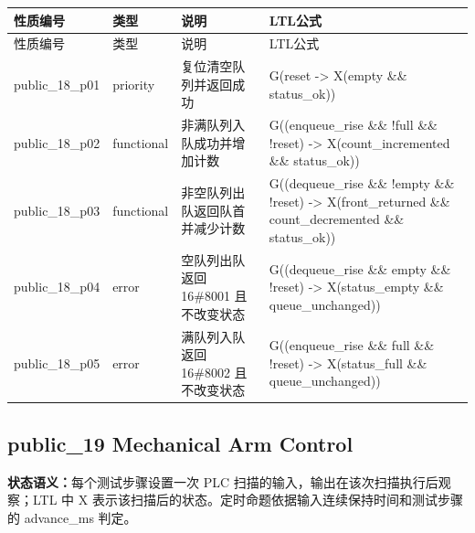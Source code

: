 \begin{longtable}{L{2.3cm}L{1.7cm}L{4.1cm}L{5.2cm}}

\toprule

性质编号 & 类型 & 说明 & LTL公式\\

\midrule

\endfirsthead

\toprule

性质编号 & 类型 & 说明 & LTL公式\\

\midrule

\endhead

{\ttfamily public\_18\_p01} & priority & 复位清空队列并返回成功 & {\ttfamily G(reset -> X(empty \&\& status\_ok))}\\

{\ttfamily public\_18\_p02} & functional & 非满队列入队成功并增加计数 & {\ttfamily G((enqueue\_rise \&\& !full \&\& !reset) -> X(count\_incremented \&\& status\_ok))}\\

{\ttfamily public\_18\_p03} & functional & 非空队列出队返回队首并减少计数 & {\ttfamily G((dequeue\_rise \&\& !empty \&\& !reset) -> X(front\_returned \&\& count\_decremented \&\& status\_ok))}\\

{\ttfamily public\_18\_p04} & error & 空队列出队返回 16\#8001 且不改变状态 & {\ttfamily G((dequeue\_rise \&\& empty \&\& !reset) -> X(status\_empty \&\& queue\_unchanged))}\\

{\ttfamily public\_18\_p05} & error & 满队列入队返回 16\#8002 且不改变状态 & {\ttfamily G((enqueue\_rise \&\& full \&\& !reset) -> X(status\_full \&\& queue\_unchanged))}\\

\bottomrule

\end{longtable}

\subsection{{\ttfamily public\_19} Mechanical Arm Control}

\noindent\textbf{状态语义：}每个测试步骤设置一次 PLC 扫描的输入，输出在该次扫描执行后观察；LTL 中 X 表示该扫描后的状态。定时命题依据输入连续保持时间和测试步骤的 advance\_ms 判定。


